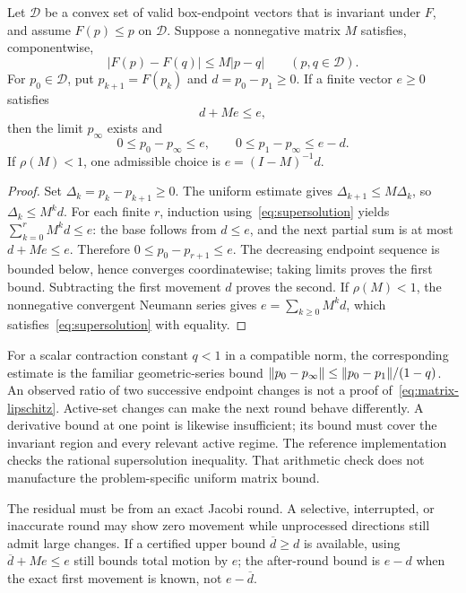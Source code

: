 \begin{theorem}\label{thm:residual}
Let $\mathcal D$ be a convex set of valid box-endpoint vectors that is
invariant under $F$, and assume $F(p)\le p$ on $\mathcal D$. Suppose
a nonnegative matrix $M$ satisfies, componentwise,
\begin{equation}\label{eq:matrix-lipschitz}
 |F(p)-F(q)|\le M|p-q|\qquad(p,q\in\mathcal D).
\end{equation}
For $p_0\in\mathcal D$, put $p_{k+1}=F(p_k)$ and
$d=p_0-p_1\ge0$. If a finite vector $e\ge0$ satisfies
\begin{equation}\label{eq:supersolution}
 d+Me\le e,
\end{equation}
then the limit $p_\infty$ exists and
\[
 0\le p_0-p_\infty\le e,\qquad
 0\le p_1-p_\infty\le e-d.
\]
If $\rho(M)<1$, one admissible choice is $e=(I-M)^{-1}d$.
\end{theorem}
\begin{proof}
Set $\Delta_k=p_k-p_{k+1}\ge0$. The uniform estimate gives
$\Delta_{k+1}\le M\Delta_k$, so $\Delta_k\le M^kd$.
For each finite $r$, induction using~\eqref{eq:supersolution} yields
$\sum_{k=0}^{r}M^kd\le e$: the base follows from $d\le e$, and
the next partial sum is at most $d+Me\le e$. Therefore
$0\le p_0-p_{r+1}\le e$. The decreasing endpoint sequence is bounded
below, hence converges coordinatewise; taking limits proves the first
bound. Subtracting the first movement $d$ proves the second. If
$\rho(M)<1$, the nonnegative convergent Neumann series gives
$e=\sum_{k\ge0}M^kd$, which satisfies~\eqref{eq:supersolution} with
equality.
\end{proof}

For a scalar contraction constant $q<1$ in a compatible norm, the
corresponding estimate is the familiar geometric-series bound
$\lVert p_0-p_\infty\rVert\le\lVert p_0-p_1\rVert/(1-q)$.
An observed ratio of two successive endpoint changes is not a proof
of~\eqref{eq:matrix-lipschitz}. Active-set changes can make the next
round behave differently. A derivative bound at one point is likewise
insufficient; its bound must cover the invariant region and every
relevant active regime. The reference implementation checks the rational
supersolution inequality. That arithmetic check does not manufacture the
problem-specific uniform matrix bound.

The residual must be from an exact Jacobi round. A selective, interrupted,
or inaccurate round may show zero movement while unprocessed directions
still admit large changes. If a certified upper bound $\overline d\ge d$
is available, using $\overline d+Me\le e$ still bounds total motion
by $e$; the after-round bound is $e-d$ when the exact first movement
is known, not $e-\overline d$.

